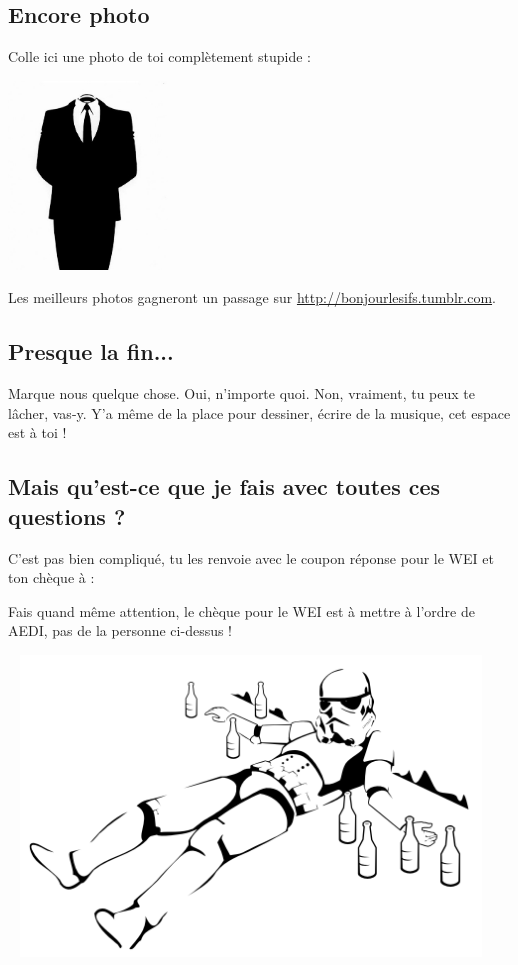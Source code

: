 \subsection*{Encore photo}
Colle ici une photo de toi complètement stupide :
\begin{center}
\includegraphics[height=5cm, angle=120]{images/anonymous.jpg}
\end{center}

Les meilleurs photos gagneront un passage sur
\url{http://bonjourlesifs.tumblr.com}.

\subsection*{Presque la fin...}
Marque nous quelque chose. Oui, n'importe quoi. Non, vraiment, tu peux te
lâcher, vas-y. Y'a même de la place pour dessiner, écrire de la musique, cet
espace est à toi !
\vspace{8cm}
\subsection{Mais qu'est-ce que je fais avec toutes ces questions ?}
C'est pas bien compliqué, tu les renvoie avec le coupon réponse pour le WEI et
ton chèque à :
\adresseCoupon



Fais quand même attention, le chèque pour le WEI est à mettre à l'ordre de AEDI, pas de la personne ci-dessus !

\vfill
\columnbreak
~
\vfill
\hspace{-5cm}
\includegraphics[height=8cm]{images/stormTrooperBourre.png}



